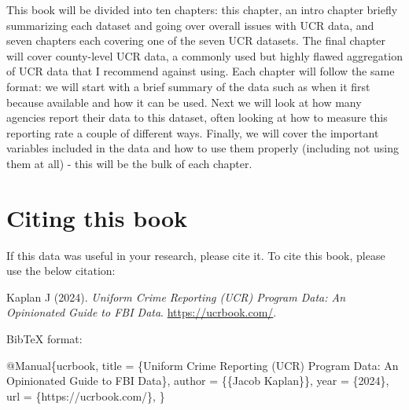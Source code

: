 \documentclass[
]{krantz}
\makeatletter
\newenvironment{Shaded}{\begin{snugshade}}{\end{snugshade}}
\newcommand{\DataTypeTok}[1]{\textcolor[rgb]{0.27,0.27,0.27}{#1}}
\newcommand{\NormalTok}[1]{#1}
\newcommand{\OtherTok}[1]{\textcolor[rgb]{0.37,0.37,0.37}{#1}}
\newcommand{\VariableTok}[1]{\textcolor[rgb]{0,0,0}{#1}}
\newenvironment{kframe}{%
\medskip{}
\setlength{\fboxsep}{.8em}
 \def\at@end@of@kframe{}%
 \ifinner\ifhmode%
  \def\at@end@of@kframe{\end{minipage}}%
  \begin{minipage}{\columnwidth}%
 \fi\fi%
 \def\FrameCommand##1{\hskip\@totalleftmargin \hskip-\fboxsep
 \colorbox{shadecolor}{##1}\hskip-\fboxsep
     \hskip-\linewidth \hskip-\@totalleftmargin \hskip\columnwidth}%
 \MakeFramed {\advance\hsize-\width
   \@totalleftmargin\z@ \linewidth\hsize
   \@setminipage}}%
 {\par\unskip\endMakeFramed%
 \at@end@of@kframe}
\renewenvironment{Shaded}{\begin{kframe}}{\end{kframe}}
\makeatother
\begin{document}
This book will be divided into ten chapters: this chapter,
an intro chapter briefly summarizing each dataset and going
over overall issues with UCR data, and seven chapters each
covering one of the seven UCR datasets. The final chapter
will cover county-level UCR data, a commonly used but highly
flawed aggregation of UCR data that I recommend against
using. Each chapter will follow the same format: we will
start with a brief summary of the data such as when it first
because available and how it can be used. Next we will look
at how many agencies report their data to this dataset,
often looking at how to measure this reporting rate a couple
of different ways. Finally, we will cover the important
variables included in the data and how to use them properly
(including not using them at all) - this will be the bulk of
each chapter.

\section{Citing this book}\label{citing-this-book}

If this data was useful in your research, please cite it. To
cite this book, please use the below citation:

Kaplan J (2024). \emph{Uniform Crime Reporting (UCR) Program
Data: An Opinionated Guide to FBI Data}.
\url{https://ucrbook.com/}.

BibTeX format:

\begin{Shaded}
\begin{Highlighting}[]
\VariableTok{@Manual}\NormalTok{\{}\OtherTok{ucrbook}\NormalTok{,}
  \DataTypeTok{title}\NormalTok{ = \{Uniform Crime Reporting (UCR) Program Data: An Opinionated Guide to FBI Data\},}
  \DataTypeTok{author}\NormalTok{ = \{\{Jacob Kaplan\}\},}
  \DataTypeTok{year}\NormalTok{ = \{2024\},}
  \DataTypeTok{url}\NormalTok{ = \{https://ucrbook.com/\},}
\NormalTok{\}}
\end{Highlighting}
\end{Shaded}
\end{document}
